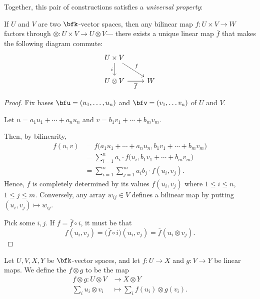 \documentclass{article}
\begin{document}
Together, this pair of constructions satisfies a \textit{universal property}:

\begin{theorem}
    If $U$ and $V$ are two $\bfk$-vector spaces, then any bilinear map $f: U \times V \to W$ factors through $\otimes: U \times V \to U \otimes V$--- there exists a unique linear map $\overline{f}$ that makes the following diagram commute:
    \[
        \begin{tikzcd}
            U \times V \arrow[rd, "f"] \arrow[d, "i"'] \\ 
            U \otimes V \arrow[r, "\overline{f}"'] & W
        \end{tikzcd}
    \]
\end{theorem}

\begin{proof}
    Fix bases $\bfu = (u_1, \ldots, u_n)$ and $\bfv = (v_1, \ldots v_n)$ of $U$ and $V$.

    Let $u = a_1u_1 + \cdots + a_nu_n$ and $v = b_1v_1 + \cdots + b_mv_m$.

    Then, by bilinearity,
    \begin{align*}
        f(u, v)
        &=
        f\Big(
            a_1u_1 + \cdots + a_nu_n,
            b_1v_1 + \cdots + b_mv_m
        \Big)
        \\
        &=
        \sum_{i=1}^n
        a_i
        \cdot
        f\Big(
            u_i,
            b_1v_1 + \cdots + b_mv_m
        \Big)
        \\
        &=
        \sum_{i=1}^n
        \sum_{j=1}^m
        a_i
        b_j
        \cdot
        f(u_i,v_j).
    \end{align*}
    Hence, $f$ is completely determined by its values $f(u_i,v_j)$ where $1 \leq i \leq n$, $1 \leq j \leq m$.
    Conversely, any array $w_{ij} \in V$ defines a bilinear map by putting $(u_i,v_j) \mapsto w_{ij}$.

    Pick some $i,j$.
    If $f = \overline{f} \circ i$, it must be that
    \[
        f(u_i, v_j)
        =
        \Big(\overline{f} \circ i\Big)(u_i, v_j)
        =
        \overline{f}(u_i \otimes v_j).
    \]
\end{proof}

\begin{definition}
    Let $U, V, X, Y$ be $\bfk$-vector spaces, and let $f: U \to X$ and $g: V \to Y$ be linear maps.
    We define the  $f \otimes g$ to be the map
    \begin{align*}
        f \otimes g:
        U \otimes V
        &\to
        X \otimes Y
        \\
        \sum_i
        u_i \otimes v_i
        &\mapsto
        \sum_i
        f(u_i) \otimes g(v_i).
    \end{align*}
\end{definition}
\end{document}
